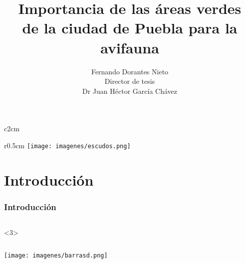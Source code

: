 \documentclass[compress]{beamer}
\title{\Large{Importancia de las áreas verdes \\ 
de la ciudad de Puebla para la avifauna}}\\[1cm]
\author{\small{Fernando Dorantes Nieto}\\[1cm]
Director de tesis\\  \scriptsize{Dr Juan Héctor García Chávez}}\\[-2cm]
\date{}
\begin{document}
\begin{frame}
\begin{wrapfigure}{c}{2cm}
\end{wrapfigure} 
\begin{wrapfigure}{r}{0.5cm}
\texttt{[image: imagenes/escudos.png]}
\end{wrapfigure}
\titlepage
\vspace{-1cm}
\end{frame}
\fontsize{10}{2}
\section{Introducción}
{
\begin{frame}
 \frametitle{Introducción}
\vspace{-0.5cm}
\begin{columns}[c]
<3>
\end{columns}

\begin{center}
\hspace*{-0.5cm}\texttt{[image: imagenes/barrasd.png]}
\end{center}
\end{frame}
}


\end{document}
